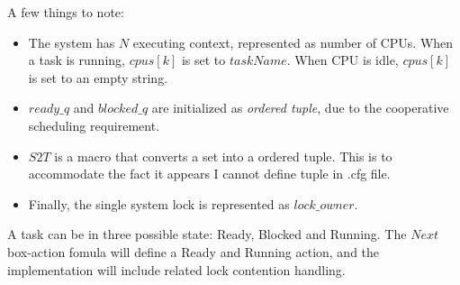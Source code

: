 \documentclass{report}
\begin{document}
A few things to note:
\begin{itemize}
    \item The system has $N$ executing context, represented as number of CPUs.
    When a task is running, $cpus[k]$ is set to $taskName$. When CPU is idle,
    $cpus[k]$ is set to an empty string. 
    \item $ready\_q$ and $blocked\_q$ are initialized as \textit{ordered tuple},
    due to the cooperative scheduling requirement.
    \item $S2T$ is a macro that converts a set into a ordered tuple. This is to
    accommodate the fact it appears I cannot define tuple in .cfg file.
    \item Finally, the single system lock is represented as $lock\_owner$. 
\end{itemize}

A task can be in three possible state: Ready, Blocked and Running. The $Next$
box-action fomula will define a Ready and Running action, and the implementation
will include related lock contention handling.\newline
\end{document}
